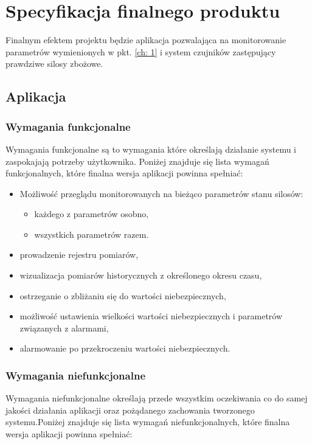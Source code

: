 \section{Specyfikacja finalnego produktu}
    Finalnym efektem projektu będzie aplikacja pozwalająca na monitorowanie parametrów
    wymienionych w pkt. \ref{ch: 1} i system czujników zastępujący prawdziwe silosy zbożowe.
    \subsection{Aplikacja} 
        \subsubsection{Wymagania funkcjonalne}
            Wymagania funkcjonalne są to wymagania które określają działanie systemu i zaspokajają potrzeby użytkownika.
            Poniżej znajduje się lista wymagań funkcjonalnych, które finalna wersja aplikacji powinna spełniać:
            \begin{itemize}
                \item Możliwość przeglądu monitorowanych na bieżąco parametrów stanu silosów:
                \begin{itemize}
                    \item każdego z parametrów osobno,
                    \item wszystkich parametrów razem.
                \end{itemize}
                \item prowadzenie rejestru pomiarów,
                \item wizualizacja pomiarów historycznych z określonego okresu czasu,
                \item ostrzeganie o zbliżaniu się do wartości niebezpiecznych,
                \item możliwość ustawienia wielkości wartości niebezpiecznych i parametrów związanych z alarmami,
                \item alarmowanie po przekroczeniu wartości niebezpiecznych.
            \end{itemize}
        \subsubsection{Wymagania niefunkcjonalne}
        Wymagania niefunkcjonalne określają przede wszystkim oczekiwania co do samej jakości działania 
        aplikacji oraz pożądanego zachowania tworzonego systemu.Poniżej znajduje się lista wymagań 
        niefunkcjonalnych, które finalna wersja aplikacji powinna spełniać:

